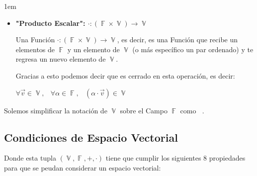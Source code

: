 \documentclass[12pt, fleqn]{report}                             %
\newenvironment{SmallIndentation}[1][0.75em]                    %
        {\begin{adjustwidth}{#1}{}\begin{footnotesize}}             %
        {\end{footnotesize}\end{adjustwidth}}                       %
\DeclareMathOperator \Space     {\quad}                         %
\DeclareMathOperator \MiniSpace {\;}                            %
\theoremstyle{break}                                            %
\DeclareMathOperator \GenericField {\mathbb{F}}                 %
\DeclareMathOperator \VectorSet    {\mathbb{V}}                 %
\DeclareMathOperator \VectorSpace  {\VectorSet_{\GenericField}} %
\begin{document}
\begin{SmallIndentation}[1em]
\begin{itemize}
                    \item
                        \textbf{"Producto Escalar": $\cdot: (\GenericField \times  \VectorSet) \to \VectorSet$}

                        Una Función $\cdot: (\GenericField \times  \VectorSet) \to \VectorSet$, es decir, es una Función
                        que recibe un elementos de $\GenericField$ y un elemento de $\VectorSet$
                        (o más específico un par ordenado) y te regresa un nuevo elemento de $\VectorSet$.

                        Gracias a esto podemos decir que es cerrado en esta operación, es decir:

                        $\forall \vec{v} \in \VectorSet, \MiniSpace
                            \forall \alpha \in \GenericField, \MiniSpace
                                (\alpha \cdot \vec{v}) \in \VectorSet$  
                \end{itemize}
            
            \end{SmallIndentation}

            Solemos simplificar la notación de $\VectorSet$ sobre el Campo $\GenericField$ como $\VectorSpace$.


            \subsection{Condiciones de Espacio Vectorial}

                Donde esta tupla $(\VectorSet, \GenericField, +, \cdot)$ tiene que cumplir los siguientes 8
                propiedades para que se peudan considerar un espacio vectorial:
\end{document}
